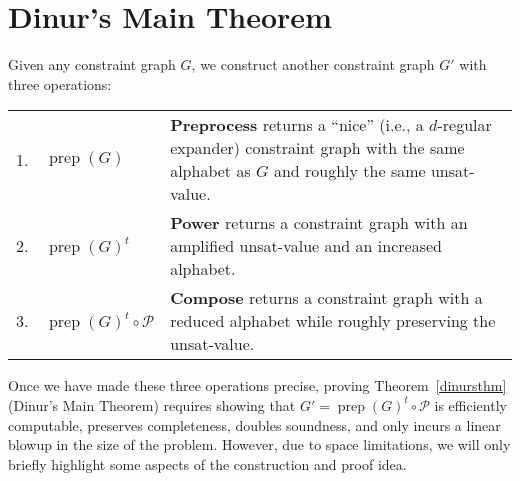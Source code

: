 \documentclass{article}
\newcommand{\N}{{\mathbf N}}
\newcommand{\UNSAT}{\mathsf{UNSAT}}
\newcommand{\prep}{{\operatorname{prep}}}
\begin{document}

\section{Dinur's Main Theorem}\label{proof}

%

Given any constraint graph $G$,
we construct another constraint graph $G'$
with three operations:
\begin{center}
\begin{tabular}{l l p{10cm}}
1. & $\prep(G)$ & \textbf{Preprocess} returns a ``nice'' (i.e., a $d$-regular expander)
       constraint graph with the same alphabet as $G$ and roughly the same unsat-value.\\
2. & $\prep(G)^t$ & \textbf{Power} returns a constraint graph with an amplified
                    unsat-value and an increased alphabet. \\
3. & $\prep(G)^t \circ \mathcal{P}$ & \textbf{Compose} returns a constraint graph with a reduced alphabet while roughly
                   preserving the unsat-value.
\end{tabular}
\end{center}
Once we have made these three operations precise,
proving Theorem~\ref{dinursthm} (Dinur's Main Theorem)
requires showing that $G' = \prep(G)^t \circ \mathcal{P}$ is efficiently
computable, preserves completeness, doubles soundness, and only
incurs a linear blowup in the size of the problem.
However, due to space limitations, we will only briefly highlight some
aspects of the construction and proof idea.
\end{document}
